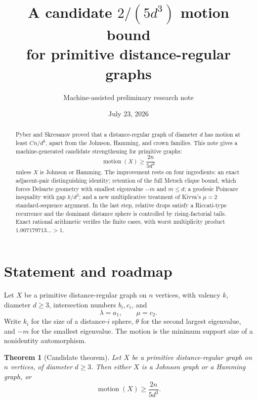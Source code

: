 \documentclass[11pt]{amsart}
\title[A candidate $2/(5d^3)$ motion bound]{A candidate $2/(5d^3)$ motion bound\\for primitive distance-regular graphs}
\author{Machine-assisted preliminary research note}
\date{July 23, 2026}
\newtheorem{theorem}{Theorem}[section]
\theoremstyle{definition}
\newcommand{\mot}{\operatorname{motion}}
\begin{document}
\begin{abstract}
Pyber and Skresanov proved that a distance-regular graph of diameter $d$ has motion at least $Cn/d^6$, apart from the Johnson, Hamming, and crown families.  This note gives a machine-generated candidate strengthening for primitive graphs:
\[
  \mot(X)\ge \frac{2n}{5d^3}
\]
unless $X$ is Johnson or Hamming.  The improvement rests on four ingredients: an exact adjacent-pair distinguishing identity; retention of the full Metsch clique bound, which forces Delsarte geometry with smallest eigenvalue $-m$ and $m\le d$; a geodesic Poincare inequality with gap $k/d^2$; and a new multiplicative treatment of Kivva's $\mu=2$ standard-sequence argument.  In the last step, relative drops satisfy a Riccati-type recurrence and the dominant distance sphere is controlled by rising-factorial tails.  Exact rational arithmetic verifies the finite cases, with worst multiplicity product $1.007179713\ldots>1$.
\end{abstract}
\maketitle

\begin{center}
\end{center}

\section{Statement and roadmap}
Let $X$ be a primitive distance-regular graph on $n$ vertices, with valency $k$, diameter $d\ge3$, intersection numbers $b_i,c_i$, and
\[
 \lambda=a_1,\qquad \mu=c_2.
\]
Write $k_i$ for the size of a distance-$i$ sphere, $\theta$ for the second largest eigenvalue, and $-m$ for the smallest eigenvalue.  The motion is the minimum support size of a nonidentity automorphism.

\begin{theorem}[Candidate theorem]\label{thm:main}
Let $X$ be a primitive distance-regular graph on $n$ vertices, of diameter $d\ge3$.  Then either $X$ is a Johnson graph or a Hamming graph, or
\[
 \boxed{\mot(X)\ge \frac{2n}{5d^3}.}
\]
\end{theorem}
\end{document}
